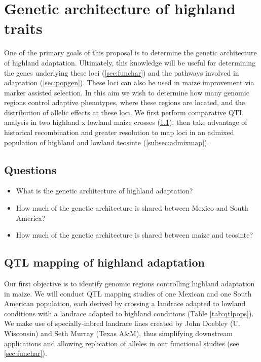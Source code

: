 
\renewcommand{\thesection}{Aim \arabic{section}}
\section{Genetic architecture of highland traits} \label{sec:qtl}

One of the primary goals of this proposal is to determine the genetic architecture of highland adaptation. Ultimately, this knowledge will be useful for determining the genes underlying these loci (\ref{sec:funchar}) and the pathways involved in adaptation (\ref{sec:popgen}). These loci can also be used in maize improvement via marker assisted selection. In this aim we wish to determine how many genomic regions control adaptive phenotypes, where these regions are located, and the distribution of allelic effects at these loci. We first perform comparative QTL analysis in two highland x lowland maize crosses (\ref{subsec:qtlmap}), then take advantage of historical recombination and greater resolution to map loci in an admixed population of highland and lowland teosinte (\ref{subsec:admixmap}).

\subsection*{Questions}
\begin{itemize}[topsep=0pt,itemsep=-1ex,partopsep=1ex,parsep=1ex]
\item What is the genetic architecture of highland adaptation?
\item How much of the genetic architecture is shared between Mexico and South America?
\item How much of the genetic architecture is shared between maize and teosinte?
\end{itemize}

\subsection{QTL mapping of highland adaptation} \label{subsec:qtlmap}

Our first objective is to identify  genomic regions controlling highland adaptation in maize.  We will conduct QTL mapping studies of one Mexican and one South American population, each derived by crossing a landrace adapted to lowland conditions with a  landrace adapted to highland conditions (Table \ref{tab:qtlpops}).  We make use of specially-inbred landrace lines created by John Doebley (U. Wisconsin) and Seth Murray (Texas A\&M), thus simplifying downstream applications and allowing replication of alleles in our functional studies (see \ref{sec:funchar}). 

